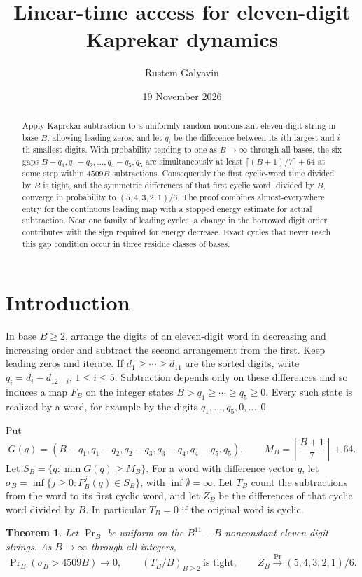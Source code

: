 \documentclass[11pt,reqno]{amsart}
\title[Eleven-digit Kaprekar dynamics]{Linear-time access for eleven-digit Kaprekar dynamics}
\author{Rustem Galyavin}
\date{19 November 2026}
\newtheorem{theorem}{Theorem}
\theoremstyle{remark}
\begin{document}
\begin{abstract}
Apply Kaprekar subtraction to a uniformly random nonconstant eleven-digit string in base \(B\), allowing leading zeros, and let \(q_i\) be the difference between its \(i\)th largest and \(i\)th smallest digits. With probability tending to one as \(B\to\infty\) through all bases, the six gaps \(B-q_1,q_1-q_2,\ldots,q_4-q_5,q_5\) are simultaneously at least \(\lceil(B+1)/7\rceil+64\) at some step within \(4509B\) subtractions. Consequently the first cyclic-word time divided by \(B\) is tight, and the symmetric differences of that first cyclic word, divided by \(B\), converge in probability to \((5,4,3,2,1)/6\). The proof combines almost-everywhere entry for the continuous leading map with a stopped energy estimate for actual subtraction. Near one family of leading cycles, a change in the borrowed digit order contributes with the sign required for energy decrease. Exact cycles that never reach this gap condition occur in three residue classes of bases.
\end{abstract}
\maketitle

\section{Introduction}

In base \(B\ge2\), arrange the digits of an eleven-digit word in decreasing and increasing order and subtract the second arrangement from the first. Keep leading zeros and iterate. If \(d_1\ge\cdots\ge d_{11}\) are the sorted digits, write \(q_i=d_i-d_{12-i}\), \(1\le i\le5\). Subtraction depends only on these differences and so induces a map \(F_B\) on the integer states \(B>q_1\ge\cdots\ge q_5\ge0\). Every such state is realized by a word, for example by the digits \(q_1,\ldots,q_5,0,\ldots,0\).

Put
\[
 G(q)=(B-q_1,q_1-q_2,q_2-q_3,q_3-q_4,q_4-q_5,q_5),\qquad
 M_B=\left\lceil\frac{B+1}{7}\right\rceil+64.
\]
Let \(S_B=\{q:\min G(q)\ge M_B\}\). For a word with difference vector \(q\), let \(\sigma_B=\inf\{j\ge0:F_B^j(q)\in S_B\}\), with \(\inf\emptyset=\infty\). Let \(T_B\) count the subtractions from the word to its first cyclic word, and let \(Z_B\) be the differences of that cyclic word divided by \(B\). In particular \(T_B=0\) if the original word is cyclic.

\begin{theorem}\label{th:main}
Let \(\Pr_B\) be uniform on the \(B^{11}-B\) nonconstant eleven-digit strings. As \(B\to\infty\) through all integers,
\[
 \Pr\nolimits_B(\sigma_B>4509B)\to0,\qquad
 (T_B/B)_{B\ge2}\ \text{is tight},\qquad
 Z_B\xrightarrow{\Pr}(5,4,3,2,1)/6 .
\]
\end{theorem}
\end{document}
